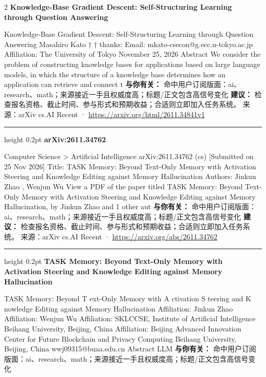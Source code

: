 \documentclass[10.5pt]{ctexart}
\begin{document}
\begin{multicols}{2}
{\large\bfseries Knowledge-Base Gradient Descent: Self-Structuring Learning through Question Answering}\par
Knowledge-Base Gradient Descent: Self-Structuring Learning through Question Answering Masahiro Kato † † thanks: Email: mkato-csecon@g.ecc.u-tokyo.ac.jp Affiliation: The University of Tokyo November 25, 2026 Abstract We consider the problem of constructing knowledge bases for applications based on large language models, in which the structure of a knowledge base determines how an application can retrieve and connect t
\textbf{与你有关：} 命中用户订阅版面：ai、research、math；来源接近一手且权威度高；标题/正文包含高信号变化
\textbf{建议：} 检查报名资格、截止时间、参与形式和预期收益；合适则立即加入任务系统。
{\footnotesize\color{ormuted} 来源：arXiv cs.AI Recent · \url{https://arxiv.org/html/2611.34841v1}}
\vspace{2mm}
\hrule height 0.2pt
\vspace{2mm}
{\large\bfseries arXiv:2611.34762}\par
Computer Science > Artificial Intelligence arXiv:2611.34762 (cs) [Submitted on 25 Nov 2026] Title: TASK Memory: Beyond Text-Only Memory with Activation Steering and Knowledge Editing against Memory Hallucination Authors: Jinkun Zhao , Wenjun Wu View a PDF of the paper titled TASK Memory: Beyond Text-Only Memory with Activation Steering and Knowledge Editing against Memory Hallucination, by Jinkun Zhao and 1 other aut
\textbf{与你有关：} 命中用户订阅版面：ai、research、math；来源接近一手且权威度高；标题/正文包含高信号变化
\textbf{建议：} 检查报名资格、截止时间、参与形式和预期收益；合适则立即加入任务系统。
{\footnotesize\color{ormuted} 来源：arXiv cs.AI Recent · \url{https://arxiv.org/abs/2611.34762}}
\vspace{2mm}
\hrule height 0.2pt
\vspace{2mm}
{\large\bfseries TASK Memory: Beyond Text-Only Memory with Activation Steering and Knowledge Editing against Memory Hallucination}\par
TASK Memory: Beyond T ext-Only Memory with A ctivation S teering and K nowledge Editing against Memory Hallucination Affiliation: Jinkun Zhao Affiliation: Wenjun Wu Affiliation: SKLCCSE, Institute of Artificial Intelligence Beihang University, Beijing, China Affiliation: Beijing Advanced Innovation Center for Future Blockchain and Privacy Computing Beihang University, Beijing, China wwj09315@buaa.edu.cn Abstract LLM 
\textbf{与你有关：} 命中用户订阅版面：ai、research、math；来源接近一手且权威度高；标题/正文包含高信号变化

\end{multicols}
\end{document}
